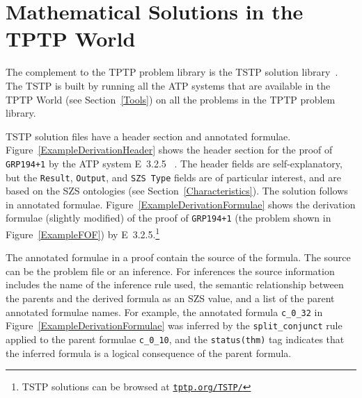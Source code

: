 \documentclass[runningheads]{llncs}
\begin{document}
\section{Mathematical Solutions in the TPTP World}
\label{TSTP}

The complement to the TPTP problem library is the TSTP solution library~\cite{Sut07-CSR,Sut10}.
The TSTP is built by running all the ATP systems that are available in the TPTP World (see 
Section~\ref{Tools}) on all the problems in the TPTP problem library.

TSTP solution files have a header section and annotated formulae.
Figure~\ref{ExampleDerivationHeader} shows the header section for the proof of {\tt GRP194+1} by
the ATP system E~3.2.5 ~\cite{SCV19}.
The header fields are self-explanatory, but the {\tt Result}, {\tt Output}, and {\tt SZS Type} 
fields are of particular interest, and are based on the SZS ontologies 
(see Section~\ref{Characteristics}).
The solution follows in annotated formulae.
Figure~\ref{ExampleDerivationFormulae} shows the derivation formulae (slightly modified) of the
proof of {\tt GRP194+1} (the problem shown in Figure~\ref{ExampleFOF}) by E~3.2.5.\footnote{%
TSTP solutions can be browsed at \href{https://tptp.org/TSTP/}{{\tt tptp.org/TSTP/}}}

The annotated formulae in a proof contain the source of the formula. 
The source can be the problem file or an inference.
For inferences the source information includes the name of the inference rule used, the semantic 
relationship between the parents and the derived formula as an SZS value, and a list of the 
parent annotated formulae names.
For example, the annotated formula {\tt c\_0\_32} in Figure~\ref{ExampleDerivationFormulae} was 
inferred by the {\tt split\_conjunct} rule applied to the parent formulae {\tt c\_0\_10}, and 
the {\tt status(thm)} tag indicates that the inferred formula is a logical consequence of the 
parent formula.
\end{document}
